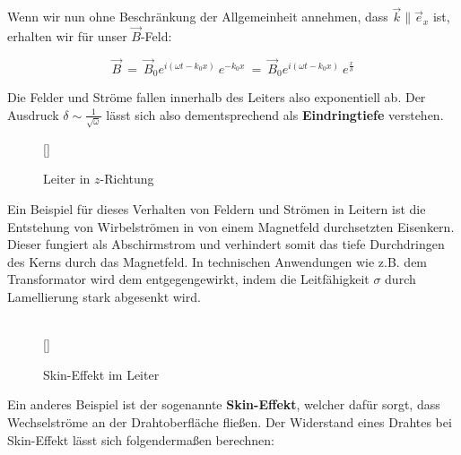 Wenn wir nun ohne Beschränkung der Allgemeinheit annehmen, dass $\vec{k}\parallel\vec{e}_x$ ist, erhalten wir für unser $\vec{B}$-Feld:

\begin{equation*}
\vec{B} \ = \ \vec{B}_0 e^{i(\omega t-k_0 x)} \ e^{-k_0 x}  \ = \  \vec{B}_0 e^{i(\omega t-k_0 x)} \ e^{\frac{x}{\delta}}
\end{equation*}

Die Felder und Ströme fallen innerhalb des Leiters also exponentiell ab. Der Ausdruck $\delta\sim \frac{1}{\sqrt{\omega}}$ lässt sich also dementsprechend als \textbf{Eindringtiefe} verstehen.

\begin{wrapfigure}[]{l}[0cm]{0cm}
	\raisebox{0pt}[\dimexpr{}\baselineskip\relax]{
		\colorbox{hgrey}{
		}
}
	\caption{Leiter in $z$-Richtung}
\end{wrapfigure}
Ein Beispiel für dieses Verhalten von Feldern und Strömen in Leitern ist die Entstehung von Wirbelströmen in von einem Magnetfeld durchsetzten Eisenkern. Dieser fungiert als Abschirmstrom und verhindert somit das tiefe Durchdringen des Kerns durch das Magnetfeld. In technischen Anwendungen wie z.B. dem Transformator wird dem entgegengewirkt, indem die Leitfähigkeit $\sigma$ durch Lamellierung stark abgesenkt wird.\\
\ \\ \linebreak

\begin{wrapfigure}[]{r}[0cm]{0cm}
	\raisebox{0pt}[\dimexpr{}\baselineskip\relax]{
		\colorbox{hgrey}{
		}
	}
	\caption{Skin-Effekt im Leiter}
\end{wrapfigure}
Ein anderes Beispiel ist der sogenannte \textbf{Skin-Effekt}, welcher dafür sorgt, dass Wechselströme an der Drahtoberfläche fließen. Der Widerstand eines Drahtes bei Skin-Effekt lässt sich folgendermaßen berechnen:

